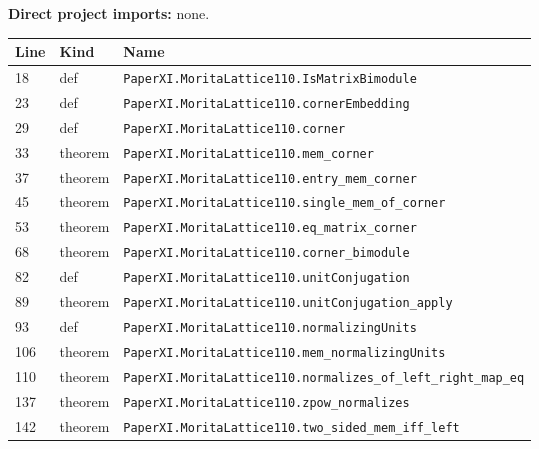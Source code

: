 \documentclass[10pt,oneside]{book}
\begin{document}

\textbf{Direct project imports:} none.

\begin{longtable}{@{}p{}p{}p{}@{}}\toprule Line&Kind&Name\\\midrule\endhead

18&def&\nolinkurl{PaperXI.MoritaLattice110.IsMatrixBimodule}\\

23&def&\nolinkurl{PaperXI.MoritaLattice110.cornerEmbedding}\\

29&def&\nolinkurl{PaperXI.MoritaLattice110.corner}\\

33&theorem&\nolinkurl{PaperXI.MoritaLattice110.mem_corner}\\

37&theorem&\nolinkurl{PaperXI.MoritaLattice110.entry_mem_corner}\\

45&theorem&\nolinkurl{PaperXI.MoritaLattice110.single_mem_of_corner}\\

53&theorem&\nolinkurl{PaperXI.MoritaLattice110.eq_matrix_corner}\\

68&theorem&\nolinkurl{PaperXI.MoritaLattice110.corner_bimodule}\\

82&def&\nolinkurl{PaperXI.MoritaLattice110.unitConjugation}\\

89&theorem&\nolinkurl{PaperXI.MoritaLattice110.unitConjugation_apply}\\

93&def&\nolinkurl{PaperXI.MoritaLattice110.normalizingUnits}\\

106&theorem&\nolinkurl{PaperXI.MoritaLattice110.mem_normalizingUnits}\\

110&theorem&\nolinkurl{PaperXI.MoritaLattice110.normalizes_of_left_right_map_eq}\\

137&theorem&\nolinkurl{PaperXI.MoritaLattice110.zpow_normalizes}\\

142&theorem&\nolinkurl{PaperXI.MoritaLattice110.two_sided_mem_iff_left}\\


\end{longtable}
\end{document}
